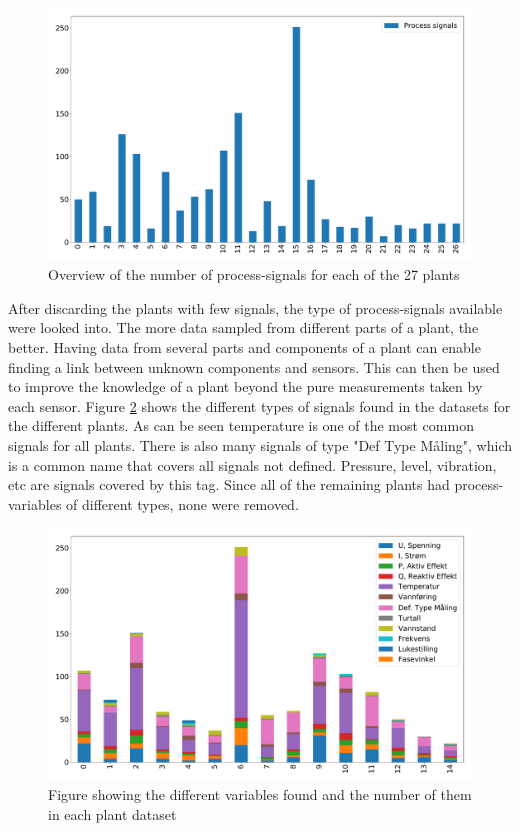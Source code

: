         \begin{figure}[h]
            \centering
            \includegraphics[width=\textwidth]{report/figures/data/plant_process_signals_overview.pdf}
            \caption{Overview of the number of process-signals for each of the 27 plants}
            \label{fig:process_signal_overview}
        \end{figure}
        
        After discarding the plants with few signals, the type of process-signals available were looked into. The more data sampled from different parts of a plant, the better. Having data from several parts and components of a plant can enable finding a link between unknown components and sensors. This can then be used to improve the knowledge of a plant beyond the pure measurements taken by each sensor. Figure \ref{fig:signal_type_overview} shows the different types of signals found in the datasets for the different plants. As can be seen temperature is one of the most common signals for all plants. There is also many signals of type "Def Type Måling", which is a common name that covers all signals not defined. Pressure, level, vibration, etc are signals covered by this tag. Since all of the remaining plants had process-variables of different types, none were removed. 
        
        \begin{figure}
            \centering
            \includegraphics[width=\textwidth]{report/figures/data/plant_signal_types_overview.pdf}
            \caption{Figure showing the different variables found and the number of them in each plant dataset}
            \label{fig:signal_type_overview}
        \end{figure}
        
